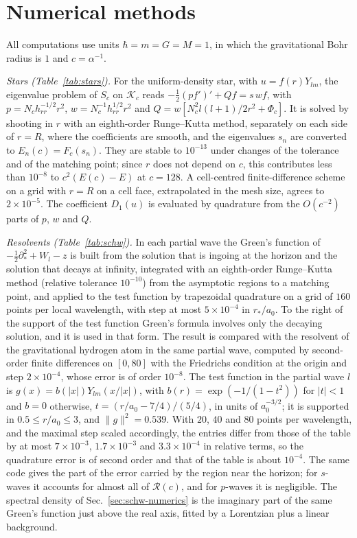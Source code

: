 \documentclass[%
 aip,
 jmp,
 amsmath,amssymb,
 reprint, onecolumn
]{revtex4-1}
\theoremstyle{definition}
\theoremstyle{remark}
\newcommand{\K}{\mathcal{K}}
\begin{document}
\section{Numerical methods}\label{app:numerics}

All computations use units $\hbar=m=G=M=1$, in which the gravitational
Bohr radius is $1$ and $c=\alpha^{-1}$.

\emph{Stars (Table~\ref{tab:stars}).} For the uniform-density star, with
$u=f(r)Y_{lm}$, the eigenvalue problem of $S_c$ on $\K_c$ reads
$-\frac12(pf')'+Qf=s\,wf$, with $p=N_ch_{rr}^{-1/2}r^2$,
$w=N_c^{-1}h_{rr}^{1/2}r^2$ and $Q=w[N_c^2l(l+1)/2r^2+\Phi_c]$. It is
solved by shooting in $r$ with an eighth-order Runge--Kutta method,
separately on each side of $r=R$, where the coefficients are smooth, and
the eigenvalues $s_n$ are converted to $E_n(c)=F_c(s_n)$. They are stable
to $10^{-13}$ under changes of the tolerance and of the matching point;
since $r$ does not depend on $c$, this contributes less than $10^{-8}$ to
$c^2(E(c)-E)$ at $c=128$. A cell-centred finite-difference scheme on a
grid with $r=R$ on a cell face, extrapolated in the mesh size, agrees to
$2\times10^{-5}$. The coefficient $D_1(u)$ is evaluated by quadrature
from the $O(c^{-2})$ parts of $p$, $w$ and $Q$.

\emph{Resolvents (Table~\ref{tab:schw}).} In each partial wave the
Green's function of $-\frac12\partial_*^2+W_l-z$ is built from the
solution that is ingoing at the horizon and the solution that decays at
infinity, integrated with an eighth-order Runge--Kutta method (relative
tolerance $10^{-10}$) from the asymptotic regions to a matching point,
and applied to the test function by trapezoidal quadrature on a grid of
$160$ points per local wavelength, with step at most $5\times10^{-4}$ in
$r_*/a_0$. To the right of the support of the test function
Green's formula involves only the decaying solution, and it is used in
that form. The result is compared with the resolvent of the gravitational
hydrogen atom in the same partial wave, computed by second-order finite
differences on $[0,80]$ with the Friedrichs condition at the origin and
step $2\times10^{-4}$, whose error is of order $10^{-8}$. The test
function in the partial wave $l$ is $g(x)=b(|x|)Y_{lm}(x/|x|)$, with
$b(r)=\exp(-1/(1-t^2))$ for $|t|<1$ and $b=0$ otherwise,
$t=(r/a_0-7/4)/(5/4)$, in units of $a_0^{-3/2}$; it is supported in
$0.5\leq r/a_0\leq3$, and $\|g\|^2=0.539$. With $20$,
$40$ and $80$ points per wavelength, and the maximal step scaled
accordingly, the entries differ from those of the table by at most
$7\times10^{-3}$, $1.7\times10^{-3}$ and $3.3\times10^{-4}$ in relative
terms, so the quadrature error is of second order and that of the table
is about $10^{-4}$. The same code gives the part of the error carried by the
region near the horizon; for $s$-waves it accounts for almost all of
$\mathcal{R}(c)$, and for $p$-waves it is negligible.
The spectral density of Sec.~\ref{sec:schw-numerics} is the imaginary
part of the same Green's function just above the real axis, fitted by a
Lorentzian plus a linear background.
\end{document}

